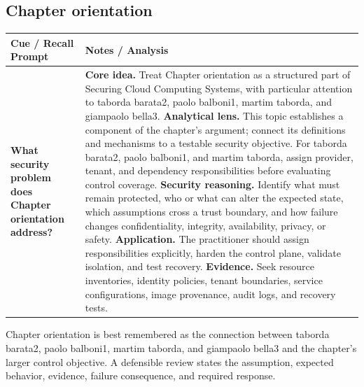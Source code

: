 \documentclass[11pt]{article}
\newcommand{\CornellHeader}{%
\rowcolor{Navy}\color{white}\bfseries Cue / Recall Prompt & \color{white}\bfseries Notes / Analysis\\\hline}
\newcommand{\CornellRow}[2]{%
\cellcolor{CueGray}\RaggedRight\textbf{#1} & \RaggedRight #2\\\hline}
\begin{document}
\subsection*{Chapter orientation}
\begin{longtable}{>{\RaggedRight\arraybackslash}p{}|>{\RaggedRight\arraybackslash}p{}}
\CornellHeader
\CornellRow{What security problem does Chapter orientation address?}{\textbf{Core idea.} Treat Chapter orientation as a structured part of Securing Cloud Computing Systems, with particular attention to taborda barata2, paolo balboni1, martim taborda, and giampaolo bella3. \textbf{Analytical lens.} This topic establishes a component of the chapter's argument; connect its definitions and mechanisms to a testable security objective. For taborda barata2, paolo balboni1, and martim taborda, assign provider, tenant, and dependency responsibilities before evaluating control coverage. \textbf{Security reasoning.} Identify what must remain protected, who or what can alter the expected state, which assumptions cross a trust boundary, and how failure changes confidentiality, integrity, availability, privacy, or safety. \textbf{Application.} The practitioner should assign responsibilities explicitly, harden the control plane, validate isolation, and test recovery. \textbf{Evidence.} Seek resource inventories, identity policies, tenant boundaries, service configurations, image provenance, audit logs, and recovery tests.}
\end{longtable}
\begin{topicsummary}
Chapter orientation is best remembered as the connection between taborda barata2, paolo balboni1, martim taborda, and giampaolo bella3 and the chapter's larger control objective. A defensible review states the assumption, expected behavior, evidence, failure consequence, and required response.
\end{topicsummary}
\end{document}
